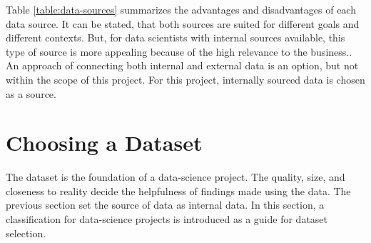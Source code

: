 	Table \ref{table:data-sources} summarizes the advantages and disadvantages of each data source. It can be stated, that both sources are suited for different goals and different contexts. But, for data scientists with internal sources available, this type of source is more appealing because of the high relevance to the business.. An approach of connecting both internal and external data is an option, but not within the scope of this project. For this project, internally sourced data is chosen as a source.
	
	\section{Choosing a Dataset}
	The dataset is the foundation of a data-science project. The quality, size, and closeness to reality decide the helpfulness of findings made using the data. The previous section set the source of data as internal data. In this section, a classification for data-science projects is introduced as a guide for dataset selection.
	
